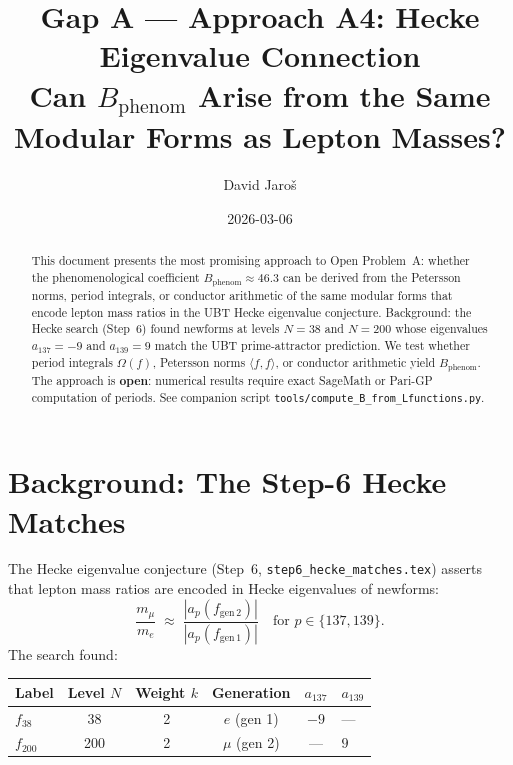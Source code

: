 \documentclass[12pt,a4paper]{article}
\title{\textbf{Gap A --- Approach A4: Hecke Eigenvalue Connection}\\
         \large Can $B_{\mathrm{phenom}}$ Arise from the Same Modular Forms
         as Lepton Masses?}
\author{David Jaro\v{s}}
\date{2026-03-06}
\theoremstyle{definition}
\theoremstyle{remark}
\begin{document}
  \maketitle

  \begin{abstract}
  This document presents the most promising approach to Open Problem~A: whether
  the phenomenological coefficient $B_{\mathrm{phenom}} \approx 46.3$ can be
  derived from the Petersson norms, period integrals, or conductor arithmetic
  of the same modular forms that encode lepton mass ratios in the UBT Hecke
  eigenvalue conjecture.  Background: the Hecke search (Step~6) found newforms
  at levels $N = 38$ and $N = 200$ whose eigenvalues $a_{137} = -9$ and
  $a_{139} = 9$ match the UBT prime-attractor prediction.  We test whether
  period integrals $\Omega(f)$, Petersson norms $\langle f,f \rangle$, or
  conductor arithmetic yield $B_{\mathrm{phenom}}$.  The approach is
  \textbf{open}: numerical results require exact SageMath or Pari-GP computation
  of periods.  See companion script \texttt{tools/compute\_B\_from\_Lfunctions.py}.
  \end{abstract}
\fi

\section{Background: The Step-6 Hecke Matches}
\label{sec:background}

The Hecke eigenvalue conjecture (Step~6,
\texttt{step6\_hecke\_matches.tex}) asserts that lepton mass ratios are
encoded in Hecke eigenvalues of newforms:
\begin{equation}
  \frac{m_\mu}{m_e} \;\approx\;
  \frac{|a_p(f_{\mathrm{gen\,2}})|}{|a_p(f_{\mathrm{gen\,1}})|}
  \quad \text{for } p \in \{137, 139\}.
  \label{eq:hecke_mass_ratio}
\end{equation}
The search found:

\begin{center}
\begin{tabular}{lccccl}
  \toprule
  Label & Level $N$ & Weight $k$ & Generation & $a_{137}$ & $a_{139}$ \\
  \midrule
  $f_{38}$ & 38 & 2 & $e$ (gen 1) & $-9$ & --- \\
  $f_{200}$ & 200 & 2 & $\mu$ (gen 2) & --- & $9$ \\
  \bottomrule
\end{tabular}
\end{center}
\end{document}
